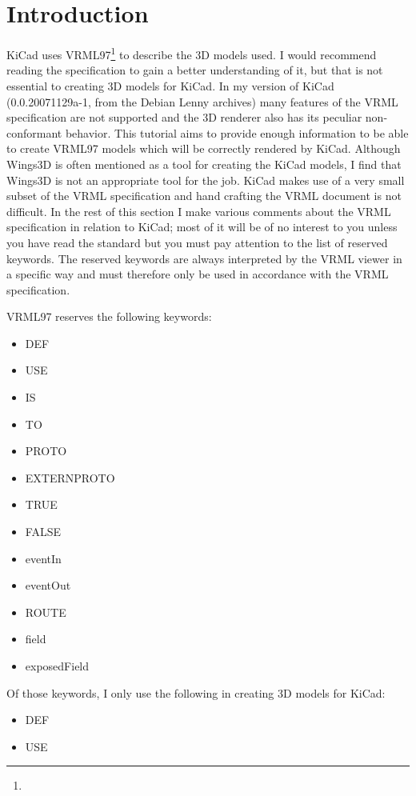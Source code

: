 \documentclass[a4paper]{article}
\begin{document}
\section{Introduction}
KiCad uses VRML97\footnote{}
to describe the 3D models used.
I would recommend reading the specification to gain a better understanding of it, but that is not essential to creating 3D models for KiCad.  In my
version of KiCad (0.0.20071129a-1, from the Debian Lenny archives) many features of the VRML specification are not supported and the 3D renderer also
has its peculiar non-conformant behavior.  This tutorial aims to provide enough information to be able to create VRML97 models which will be
correctly rendered by KiCad. Although Wings3D is often mentioned as a tool for creating the KiCad models, I find that Wings3D is not an appropriate
tool for the job.  KiCad makes use of a very small subset of the VRML specification and hand crafting the VRML document is not difficult.
In the rest of this section I make various comments about the VRML specification in relation to KiCad; most of it will be of no interest to
you unless you have read the standard but you must pay attention to the list of reserved keywords. The reserved keywords are always interpreted by the
VRML viewer in a specific way and must therefore only be used in accordance with the VRML specification.

VRML97 reserves the following keywords:

\begin{itemize}
\item {DEF}
\item {USE}
\item {IS}
\item {TO}
\item {PROTO}
\item {EXTERNPROTO}
\item {TRUE}
\item {FALSE}
\item {eventIn}
\item {eventOut}
\item {ROUTE}
\item {field}
\item {exposedField}
\end{itemize}

Of those keywords, I only use the following in creating 3D models for KiCad:
\begin{itemize}
\item {DEF}
\item {USE}
\end{itemize}
\end{document}
